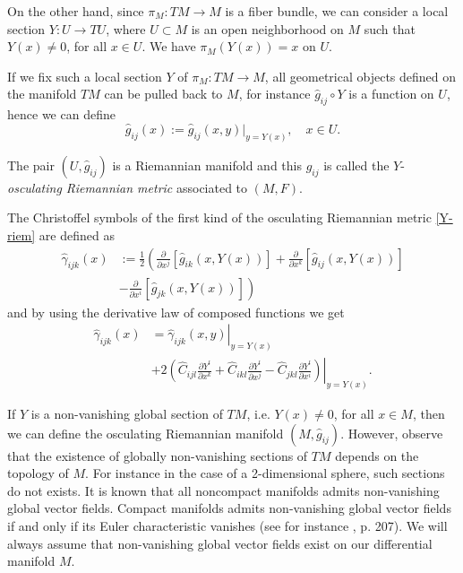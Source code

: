 \documentclass[aps,superscriptaddress, showpacs,preprintnumbers, superscriptaddress, nofootinbibt,twocolumn]{revtex4-2}
\begin{document}
On the other hand, since $\pi_M:TM\to M$ is a fiber bundle, we can consider a local section $Y:U\to TU$, where $U\subset M$ is an open neighborhood on $M$ such that $Y(x)\neq 0$, for all $x\in U$. We have $\pi_M(Y(x))=x$ on $U$.

If we fix such a local section $Y$ of $\pi_M:TM\to M$, all geometrical objects defined on the manifold $TM$ can be pulled back to $M$, for instance $\hat{g}_{ij} \circ Y$ is a function on $U$, hence we can define
\begin{equation}\label{Y-riem}
 \hat{g}_{ij}(x):=\hat{g}_{ij}(x,y)|_{y=Y(x)},\quad x\in U.
\end{equation}

The pair $(U,\hat{g}_{ij})$ is a Riemannian manifold and this $\hat{g}_{ij}$ is called the $Y$-{\it osculating Riemannian metric} associated to $(M,F)$.

The Christoffel symbols of the first kind  of the osculating Riemannian metric \eqref{Y-riem} are defined as
\begin{equation*}
\begin{split}
  \hat{\gamma}_{ijk}(x)&:=\frac{1}{2}\left(\frac{\partial}{\partial x^j}\left[\hat{g}_{ik}(x,Y(x))\right]
+\frac{\partial}{\partial x^k}\left[\hat{g}_{ij}(x,Y(x))\right]\right.\\
&\left.-\frac{\partial}{\partial x^i}\left[\hat{g}_{jk}(x,Y(x))\right]\right)
\end{split}
\end{equation*}
and by using the derivative law of composed functions we get
\begin{equation}\label{Christ for g_Y}
\begin{split}
\hat{\gamma}_{ijk}(x)&=\left.\hat{\gamma}_{ijk}(x,y)\right|_{y=Y(x)}\\
& +2\left.\left(\hat{C}_{ijl}\frac{\partial Y^l}{\partial x^k}+\hat{C}_{ikl}\frac{\partial Y^l}{\partial x^j}-\hat{C}_{jkl}\frac{\partial Y^l}{\partial x^i} \right)\right|_{y=Y(x)}.
\end{split}
\end{equation}

If $Y$ is a non-vanishing global section of $TM$, i.e. $Y(x)\neq 0$, for all $x\in M$, then we can define the osculating Riemannian manifold $(M,\hat{g}_{ij})$. However, observe that the existence of globally non-vanishing sections of $TM$ depends on the topology of $M$. For instance in the case of a 2-dimensional sphere, such sections do not exists. It is known that all noncompact manifolds admits non-vanishing global vector fields. Compact manifolds admits non-vanishing global vector fields if and only if its Euler characteristic vanishes (see for instance \cite{St}, p. 207). We will always assume that non-vanishing global vector fields exist on our differential manifold $M$.
\end{document}
